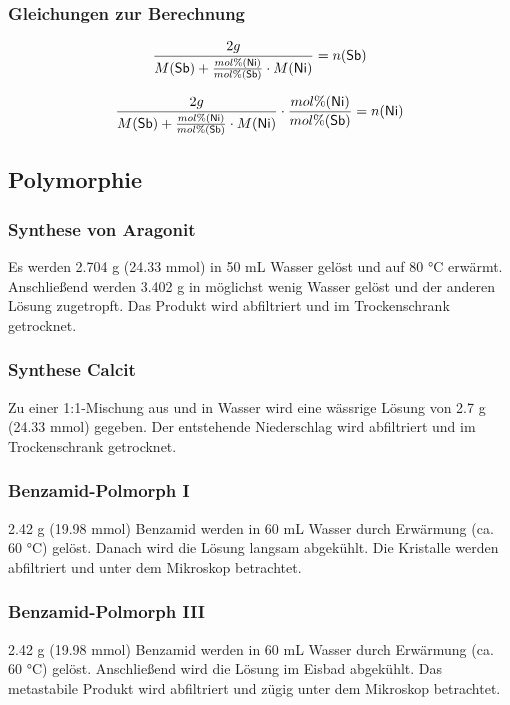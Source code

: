 \documentclass[12pt, a4paper]{article}
\begin{document}
\subsubsection{Gleichungen zur Berechnung}
\begin{equation}
  \frac{2 g}{M(\ce{Sb})+\frac{mol\%  (\ce{Ni})}{mol\%  (\ce{Sb})}\cdot M(\ce{Ni})}= n(\ce{Sb})
\end{equation}

\begin{equation}
  \frac{2 g}{M(\ce{Sb})+\frac{mol\%  (\ce{Ni})}{mol\%  (\ce{Sb})}\cdot M(\ce{Ni})}\cdot \frac{mol\%  (\ce{Ni})}{mol\%  (\ce{Sb})}= n(\ce{Ni})
\end{equation}
\newpage

\subsection{Polymorphie}
\subsubsection{Synthese von Aragonit}
Es werden 2.704 g (24.33 mmol)  in 50 mL Wasser gelöst und auf 80 °C erwärmt. Anschließend werden 3.402 g  in möglichst wenig Wasser gelöst und der anderen Lösung zugetropft. Das Produkt wird abfiltriert und im Trockenschrank getrocknet.

\subsubsection{Synthese Calcit}
Zu einer 1:1-Mischung aus  und  in Wasser wird eine wässrige Lösung von 2.7 g (24.33 mmol)  gegeben. Der entstehende Niederschlag wird abfiltriert und im Trockenschrank getrocknet.

\subsubsection{Benzamid-Polmorph I}
2.42 g (19.98 mmol) Benzamid werden in 60 mL Wasser durch Erwärmung (ca. 60 °C) gelöst. Danach wird die Lösung langsam abgekühlt. Die Kristalle werden abfiltriert und unter dem Mikroskop betrachtet.


\subsubsection{Benzamid-Polmorph III}
2.42 g (19.98 mmol) Benzamid werden in 60 mL Wasser durch Erwärmung (ca. 60 °C) gelöst. Anschließend wird die Lösung im Eisbad abgekühlt. Das metastabile Produkt wird abfiltriert und zügig unter dem Mikroskop betrachtet.
\end{document}
